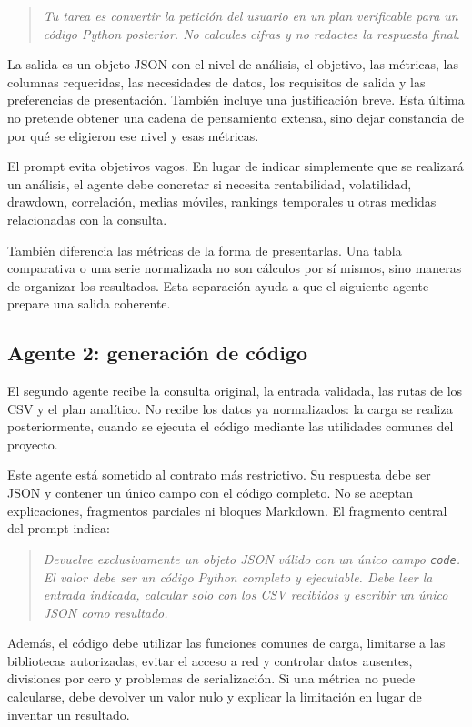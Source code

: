 \begin{quote}
\small
\textit{Tu tarea es convertir la petición del usuario en un plan verificable para un código Python posterior. No calcules cifras y no redactes la respuesta final.}
\end{quote}

La salida es un objeto JSON con el nivel de análisis, el objetivo, las métricas, las columnas requeridas, las necesidades de datos, los requisitos de salida y las preferencias de presentación. También incluye una justificación breve. Esta última no pretende obtener una cadena de pensamiento extensa, sino dejar constancia de por qué se eligieron ese nivel y esas métricas.

El prompt evita objetivos vagos. En lugar de indicar simplemente que se realizará un análisis, el agente debe concretar si necesita rentabilidad, volatilidad, drawdown, correlación, medias móviles, rankings temporales u otras medidas relacionadas con la consulta.

También diferencia las métricas de la forma de presentarlas. Una tabla comparativa o una serie normalizada no son cálculos por sí mismos, sino maneras de organizar los resultados. Esta separación ayuda a que el siguiente agente prepare una salida coherente.

\subsection{Agente 2: generación de código}

El segundo agente recibe la consulta original, la entrada validada, las rutas de los CSV y el plan analítico. No recibe los datos ya normalizados: la carga se realiza posteriormente, cuando se ejecuta el código mediante las utilidades comunes del proyecto.

Este agente está sometido al contrato más restrictivo. Su respuesta debe ser JSON y contener un único campo con el código completo. No se aceptan explicaciones, fragmentos parciales ni bloques Markdown. El fragmento central del prompt indica:

\begin{quote}
\small
\textit{Devuelve exclusivamente un objeto JSON válido con un único campo \texttt{code}. El valor debe ser un código Python completo y ejecutable. Debe leer la entrada indicada, calcular solo con los CSV recibidos y escribir un único JSON como resultado.}
\end{quote}

Además, el código debe utilizar las funciones comunes de carga, limitarse a las bibliotecas autorizadas, evitar el acceso a red y controlar datos ausentes, divisiones por cero y problemas de serialización. Si una métrica no puede calcularse, debe devolver un valor nulo y explicar la limitación en lugar de inventar un resultado.

